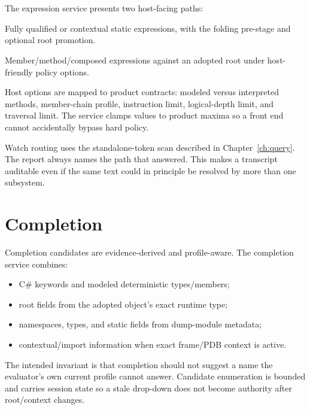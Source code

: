 \documentclass[11pt,oneside,openany]{book}
\newcommand{\typeName}[1]{\texttt{\detokenize{#1}}}
\begin{document}
\section{\typeName{ExpressionEvaluationService}}

The expression service presents two host-facing paths:

\begin{description}[style=nextline]
  \item[Static field] Fully qualified or contextual static expressions, with the folding pre-stage and optional root promotion.
  \item[Root relative] Member/method/composed expressions against an adopted root under host-friendly policy options.
\end{description}

Host options are mapped to product contracts: modeled versus interpreted methods, member-chain profile, instruction limit, logical-depth limit, and traversal limit. The service clamps values to product maxima so a front end cannot accidentally bypass hard policy.

Watch routing uses the standalone-token scan described in Chapter~\ref{ch:query}. The report always names the path that answered. This makes a transcript auditable even if the same text could in principle be resolved by more than one subsystem.

\section{Completion}

Completion candidates are evidence-derived and profile-aware. The completion service combines:

\begin{itemize}
  \item C\# keywords and modeled deterministic types/members;
  \item root fields from the adopted object's exact runtime type;
  \item namespaces, types, and static fields from dump-module metadata;
  \item contextual/import information when exact frame/PDB context is active.
\end{itemize}

The intended invariant is that completion should not suggest a name the evaluator's own current profile cannot answer. Candidate enumeration is bounded and carries session state so a stale drop-down does not become authority after root/context changes.
\end{document}
